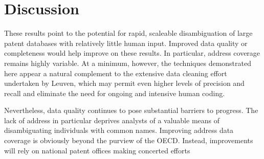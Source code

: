 \documentclass[11pt]{article}
\begin{document}



\section{Discussion}
\label{sec:discussion}

These results point to the potential for rapid, scaleable
disambiguation of large patent databases with relatively little human
input. Improved data quality or completeness would help improve on
these results. In particular, address coverage remains highly
variable. At a minimum, however, the techniques demonstrated here
appear a natural complement to the extensive data cleaning effort
undertaken by Leuven, which may permit even higher levels of precision
and recall and eliminate the need for ongoing and intensive human
coding.

Nevertheless, data quality continues to pose substantial barriers to
progress. The lack of address in particular deprives analysts of a
valuable means of disambiguating individuals with common
names. Improving address data coverage is obviously beyond the purview
of the OECD. Instead, improvements will rely on national patent
offices making concerted efforts


\end{document}
